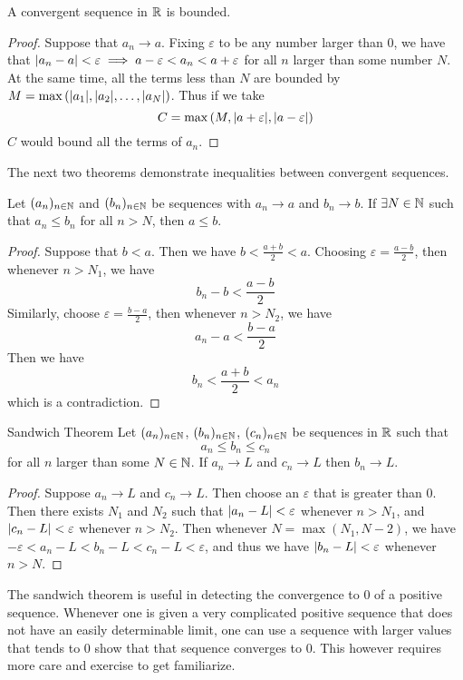 \documentclass[a4paper]{article}
\begin{document}
\begin{prp}{}{} A convergent sequence in $\mathbb{R}$ is bounded. \tcbline
\begin{proof} Suppose that $a_n\to a$. Fixing $\varepsilon$ to be any number larger than 0, we have that $\abs{a_n-a}<\varepsilon\implies a-\varepsilon<a_n<a+\varepsilon$ for all $n$ larger than some number $N$. At the same time, all the terms less than $N$ are bounded by $M=\max{(\abs{a_1}, \abs{a_2}, \dots,\abs{a_N})}$. Thus if we take $$C=\max{(M,\abs{a+\varepsilon},\abs{a-\varepsilon})}$$ $C$ would bound all the terms of $a_n$. 
\end{proof}
\end{prp}

The next two theorems demonstrate inequalities between convergent sequences. 

\begin{prp}{}{} Let $(a_n)_{n\in\mathbb{N}}$ and $(b_n)_{n\in\mathbb{N}}$ be sequences with $a_n\to a$ and $b_n\to b$. If $\exists N\in\mathbb{N}$ such that $a_n\leq b_n$ for all $n>N$, then $a\leq b$. \tcbline
\begin{proof} Suppose that $b<a$. Then we have $b<\frac{a+b}{2}<a$. Choosing $\varepsilon=\frac{a-b}{2}$, then whenever $n>N_1$, we have $$b_n-b<\frac{a-b}{2}$$ Similarly, choose $\varepsilon=\frac{b-a}{2}$, then whenever $n>N_2$, we have $$a_n-a<\frac{b-a}{2}$$ Then we have $$b_n<\frac{a+b}{2}<a_n$$ which is a contradiction. 
\end{proof}
\end{prp}

\begin{prp}{Sandwich Theorem}{} Let $(a_n)_{n\in\mathbb{N}}$, $(b_n)_{n\in\mathbb{N}}$, $(c_n)_{n\in\mathbb{N}}$ be sequences in $\mathbb{R}$ such that $$a_n\leq b_n\leq c_n$$ for all $n$ larger than some $N\in\mathbb{N}$. If $a_n\to L$ and $c_n\to L$ then $b_n\to L$. \tcbline
\begin{proof} Suppose $a_n\to L$ and $c_n\to L$. Then choose an $\varepsilon$ that is greater than $0$. Then there exists $N_1$ and $N_2$ such that $\abs{a_n-L}<\varepsilon$ whenever $n>N_1$, and $\abs{c_n-L}<\varepsilon$ whenever $n>N_2$. Then whenever $N=\max{(N_1,N-2)}$, we have $-\varepsilon<a_n-L<b_n-L<c_n-L<\varepsilon$, and thus we have $\abs{b_n-L}<\varepsilon$ whenever $n>N$. 
\end{proof}
\end{prp}

The sandwich theorem is useful in detecting the convergence to $0$ of a positive sequence. Whenever one is given a very complicated positive sequence that does not have an easily determinable limit, one can use a sequence with larger values that tends to $0$ show that that sequence converges to $0$. This however requires more care and exercise to get familiarize. \\~\\
\end{document}
